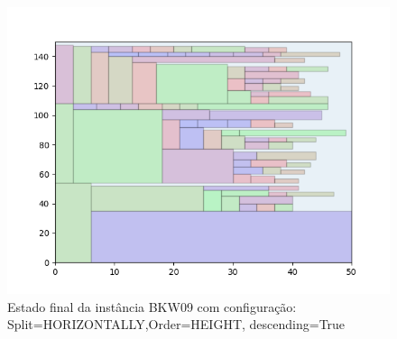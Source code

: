\begin{figure}[H]
    \centering
    \caption[]{Estado final da instância BKW09 com configuração: Split=HORIZONTALLY,Order=HEIGHT, descending=True}
    \label{fig:bkw09-horizontally-height-true}
    \includegraphics[scale=0.5]{output/figures/bkw/bkw09/horizontally/height/true/000}
\end{figure}